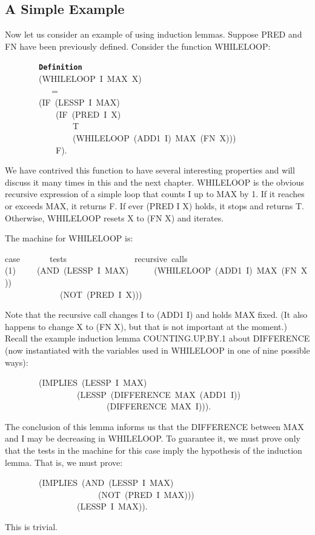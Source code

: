 \documentclass[11pt]{book}
\newenvironment{pubasis}{\begin{flushleft}\ttfamily\small}{\normalsize\rmfamily\end{flushleft}}
\newcommand{\axiomordefinition}[1]{\vspace{6pt}\texttt{\textbf{#1}}}
\newcommand{\pubdefaulttextsize}{\large}
\begin{document}
\subsection{A Simple Example}
\pubdefaulttextsize
Now let us consider an example of using induction
lemmas.  Suppose PRED and FN have been previously defined.
Consider the function WHILELOOP:
\begin{pubasis}
~~~~~~~~\axiomordefinition{Definition}\\
~~~~~~~~(WHILELOOP~I~MAX~X)\\
~~~~~~~~~~~=\\
~~~~~~~~(IF~(LESSP~I~MAX)\\
~~~~~~~~~~~~(IF~(PRED~I~X)\\
~~~~~~~~~~~~~~~~T\\
~~~~~~~~~~~~~~~~(WHILELOOP~(ADD1~I)~MAX~(FN~X)))\\
~~~~~~~~~~~~F).\\
\end{pubasis}
We have contrived this function to have several interesting properties
and will discuss it many times in this and the next chapter.
WHILELOOP is the obvious recursive expression
of a simple loop that counts I up to MAX by 1.  If it reaches or
exceeds MAX, it returns F.  If ever (PRED I X) holds, it stops and returns T.
Otherwise, WHILELOOP resets X to (FN X) and iterates.

The machine for WHILELOOP is:
\begin{pubasis}
case~~~~~~~tests~~~~~~~~~~~~~~~~recursive~calls\\

(1)~~~~~(AND~(LESSP~I~MAX)~~~~~~(WHILELOOP~(ADD1~I)~MAX~(FN~X))\\
~~~~~~~~~~~~~(NOT~(PRED~I~X)))\\
\end{pubasis}
Note that the recursive call changes I to (ADD1 I) and holds MAX fixed.
(It also happens to change X to (FN X), but that is not important at the
moment.)  Recall the example induction lemma COUNTING.UP.BY.1 about DIF\-FER\-ENCE
(now instantiated with the variables used in WHILELOOP in one of nine possible ways):
\begin{pubasis}
~~~~~~~~(IMPLIES~(LESSP~I~MAX)\\
~~~~~~~~~~~~~~~~~(LESSP~(DIFFERENCE~MAX~(ADD1~I))\\
~~~~~~~~~~~~~~~~~~~~~~~~(DIFFERENCE~MAX~I))).\\
\end{pubasis}
The conclusion of this lemma informs us that the DIFFERENCE between MAX and I may be
decreasing in WHILELOOP.  To guarantee it, we must  prove only that the tests
in the machine for this case imply the hypothesis of the induction
lemma.  That is, we must prove:
\begin{pubasis}
~~~~~~~~(IMPLIES~(AND~(LESSP~I~MAX)\\
~~~~~~~~~~~~~~~~~~~~~~(NOT~(PRED~I~MAX)))\\
~~~~~~~~~~~~~~~~~(LESSP~I~MAX)).\\
\end{pubasis}
This is trivial.
\end{document}
